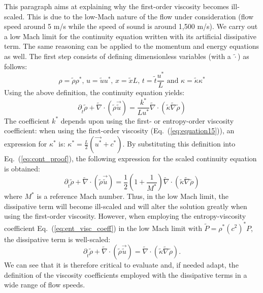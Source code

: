 \documentclass[12pt]{article}
\newcommand{\eqt}[1]{Eq.~(\ref{#1})} %
\begin{document}
This paragraph aims at explaining why the first-order viscosity becomes ill-scaled. This is due to the low-Mach nature of the flow under consideration (flow speed around 5 m/s while the speed of sound is around 1,500 m/s). We carry out a low Mach limit for the continuity equation written with its artificial dissipative term. The same reasoning can be applied to the momentum and energy equations as well. The first step consists of defining dimensionless variables (with a $\tilde{\cdot}$) as follows:
\begin{equation}
\rho = \tilde{\rho} \rho^* \text{, } u = \tilde{u} u^* \text{, } x = \tilde{x} L \text{, } t = \tilde{t} \frac{u^*}{L} \text{ and } \kappa = \tilde{\kappa} \kappa^* 
\end{equation}
Using the above definition, the continuity equation yields:
\begin{equation}
\label{eq:cont_proof}
\partial_{\tilde{t}} \tilde{\rho} + \tilde{\nabla} \cdot \left( \tilde{\rho} \vec{\tilde{u}} \right) =  \frac{k^*}{L u^*}  \tilde{\nabla}  \cdot  \left( \tilde{\kappa}  \tilde{\nabla} \tilde{\rho} \right)
\end{equation}
The coefficient $k^*$ depends upon using the first- or entropy-order viscosity coefficient: when using the first-order viscosity (\eqt{eq:equation15}), an expression for $\kappa^*$ is: $\kappa^* = \frac{L}{2}\left( \vec{u^*} + c^* \right)$. By substituting this definition into \eqt{eq:cont_proof}, the following expression for the scaled continuity equation is obtained:
\begin{equation}
\partial_{\tilde{t}} \tilde{\rho} + \tilde{\nabla} \cdot \left( \tilde{\rho} \vec{\tilde{u}} \right) = \frac{1}{2}\left( 1 + \frac{1}{M^*} \right)  \tilde{\nabla} \cdot \left(\tilde{\kappa}\tilde{\nabla} \tilde{\rho} \right)
\end{equation}
where $M^*$ is a reference Mach number. Thus, in the low Mach limit, the dissipative term will become ill-scaled and will alter the solution greatly
when using the first-order viscosity. However, when employing the entropy-viscosity coefficient \eqt{eq:ent_visc_coeff} in the low Mach limit with 
$\tilde{P} = \rho^* (c^2)^* P$, the dissipative term is well-scaled:
\begin{equation}
\partial_{\tilde{t}} \tilde{\rho} + \tilde{\nabla} \cdot \left( \tilde{\rho} \vec{\tilde{u}} \right) =  \tilde{\nabla} \cdot  \left(\tilde{\kappa}\tilde{\nabla}  \tilde{\rho} \right).
\end{equation}
We can see that it is therefore critical to evaluate and, if needed adapt, the definition of the viscosity coefficients employed with the dissipative terms in a wide range of flow speeds.
\end{document}
